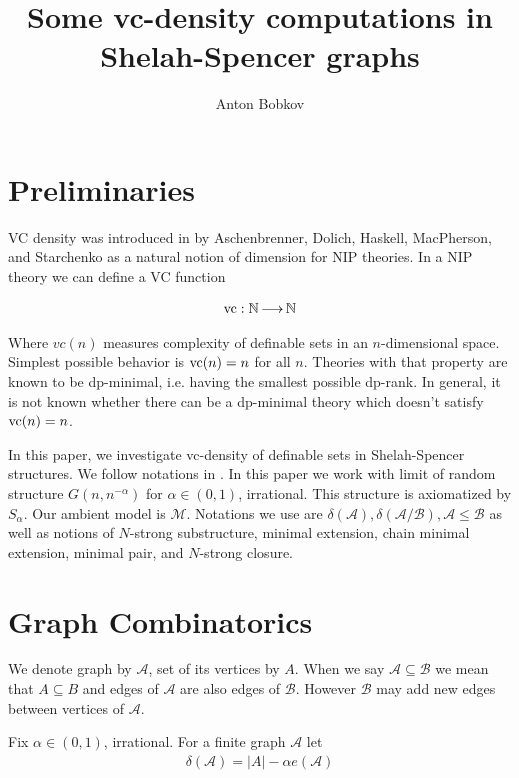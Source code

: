 \documentclass{amsart}
\title{Some vc-density computations in Shelah-Spencer graphs}
\author{Anton Bobkov}
\newcommand{\MM}{\mathscr M}
\newcommand{\A}{\mathcal A}
\newcommand{\B}{\mathcal B}
\begin{document}
\maketitle

\section{Preliminaries}

VC density was introduced in \cite{vc_density} by Aschenbrenner, Dolich, Haskell, MacPherson, and Starchenko as a natural notion of dimension for NIP theories. In a NIP theory we can define a VC function

\begin{align*}
	\operatorname{vc} : \mathbb{N} \operatorname{\longrightarrow} \mathbb{N}
\end{align*}

Where $vc(n)$ measures complexity of definable sets in an $n$-dimensional space. Simplest possible behavior is $\operatorname{vc}(n) = n$ for all $n$. Theories with that property are known to be dp-minimal, i.e. having the smallest possible dp-rank. In general, it is not known whether there can be a dp-minimal theory which doesn't satisfy $\operatorname{vc}(n)=n$.

In this paper, we investigate vc-density of definable sets in Shelah-Spencer structures.
We follow notations in \cite{laskowski}.
In this paper we work with limit of random structure $G(n, n^{-\alpha})$ for $\alpha \in (0,1)$, irrational.
This structure is axiomatized by $S_\alpha$.
Our ambient model is $\MM$.
Notations we use are $\delta(\A), \delta(\A/\B), \A \leq \B$ as well as notions of $N$-strong substructure, minimal extension, chain minimal extension, minimal pair, and $N$-strong closure.

\section{Graph Combinatorics}

We denote graph by $\A$, set of its vertices by $A$.
When we say $\A \subseteq \B$ we mean that $A \subseteq B$ and edges of $\A$ are also edges of $\B$.
However $\B$ may add new edges between vertices of $\A$.

Fix $\alpha \in (0,1)$, irrational.
For a finite graph $\A$ let
\begin{align*}
	\delta(\A) = |A| - \alpha e(\A)
\end{align*}
\end{document}
